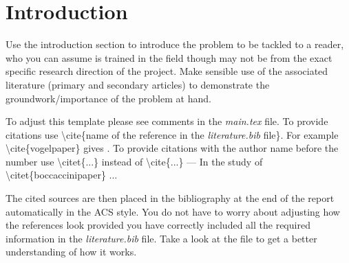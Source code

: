 \section{Introduction}
Use the introduction section to introduce the problem to be tackled to a reader, who you can assume is trained in the field though may not be from the exact specific research direction of the project. Make sensible use of the associated literature (primary and secondary articles) to demonstrate the groundwork/importance of the problem at hand.

To adjust this template please see comments in the \textit{main.tex} file. To provide citations use \textbackslash cite\{name of the reference in the \textit{literature.bib} file\}. For example \textbackslash cite\{vogelpaper\} gives \cite{vogelpaper}. To provide citations with the author name before the number use \textbackslash citet\{...\} instead of \textbackslash cite\{...\} --- In the study of \textbackslash citet\{boccaccinipaper\} \citet{boccaccinipaper}...

The cited sources are then placed in the bibliography at the end of the report automatically in the ACS style. You do not have to worry about adjusting how the references look provided you have correctly included all the required information in the \textit{literature.bib} file. Take a look at the file to get a better understanding of how it works.
